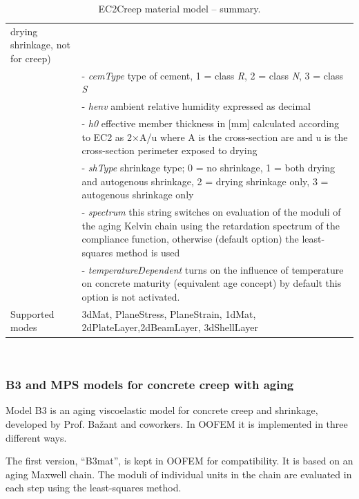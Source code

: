 \documentclass[a4paper]{article}
\newcommand{\param}[1]{{\it #1}}
\newenvironment{mmt}{\begin{tabular}{|l|p{9cm}|}}{\end{tabular}\\}
\newenvironment{mmt}{\begin{tabular}{|l|l|}}{\end{tabular}\\}
\begin{document}
\begin{table}[!htb]
\begin{mmt}
drying shrinkage, not for creep)\\
&- \param{cemType} type of cement, 1 = class {\sl{R}}, 2 = class {\sl{N}}, 3 = class
{\sl{S}}\\
&- \param{henv} ambient relative humidity expressed as decimal\\
&- \param{h0} effective member thickness in [mm] calculated according
to EC2 as 2$\times$A/u where A is the cross-section are and u is the
cross-section perimeter exposed to drying\\
&- \param{shType} shrinkage type; 0 = no shrinkage, 1 = both drying
and autogenous shrinkage, 2 = drying shrinkage only, 3 = autogenous
shrinkage only\\
&- \param{spectrum} this string switches on evaluation of the moduli
of the aging
Kelvin chain using the retardation spectrum of the compliance
function, otherwise (default option) the least-squares method is used\\
&- \param{temperatureDependent} turns on the influence of temperature
on concrete maturity (equivalent age concept) by default this option is not activated.\\
Supported modes& 3dMat, PlaneStress, PlaneStrain, 1dMat,
2dPlateLayer,2dBeamLayer, 3dShellLayer\\
\hline
\end{mmt}
\caption{EC2Creep material model -- summary.}
\label{ec2creep_table}
\end{table}



\subsubsection{B3 and MPS models for concrete creep with aging}

Model B3 is an aging viscoelastic model for concrete creep and shrinkage, developed by Prof. Ba\v{z}ant and coworkers. In OOFEM it is implemented in three different ways. 

The first version, ``B3mat'', is kept in OOFEM for compatibility. It is based on an aging Maxwell chain. The moduli of individual units in the chain are evaluated in each step using the least-squares method.
\end{document}
